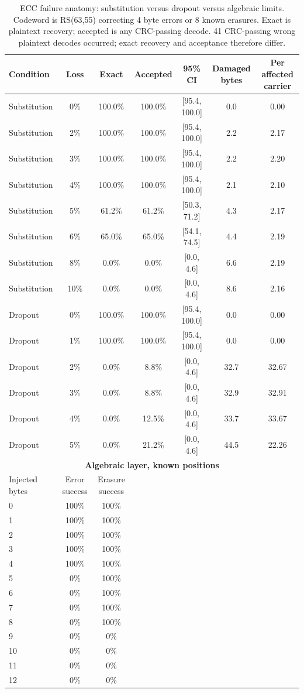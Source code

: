 \begin{table}[htbp]
\centering
\caption{ECC failure anatomy: substitution versus dropout versus algebraic limits. Codeword is RS(63,55) correcting 4 byte errors or 8 known erasures. Exact is plaintext recovery; accepted is any CRC-passing decode. 41 CRC-passing wrong plaintext decodes occurred; exact recovery and acceptance therefore differ.}
\label{tab:ecc_failure_modes}
\begin{tabular}{lcccccc}
\toprule
Condition & Loss & Exact & Accepted & 95\% CI & Damaged bytes & Per affected carrier \\
\midrule
Substitution & 0\% & 100.0\% & 100.0\% & [95.4, 100.0] & 0.0 & 0.00 \\
Substitution & 2\% & 100.0\% & 100.0\% & [95.4, 100.0] & 2.2 & 2.17 \\
Substitution & 3\% & 100.0\% & 100.0\% & [95.4, 100.0] & 2.2 & 2.20 \\
Substitution & 4\% & 100.0\% & 100.0\% & [95.4, 100.0] & 2.1 & 2.10 \\
Substitution & 5\% & 61.2\% & 61.2\% & [50.3, 71.2] & 4.3 & 2.17 \\
Substitution & 6\% & 65.0\% & 65.0\% & [54.1, 74.5] & 4.4 & 2.19 \\
Substitution & 8\% & 0.0\% & 0.0\% & [0.0, 4.6] & 6.6 & 2.19 \\
Substitution & 10\% & 0.0\% & 0.0\% & [0.0, 4.6] & 8.6 & 2.16 \\
Dropout & 0\% & 100.0\% & 100.0\% & [95.4, 100.0] & 0.0 & 0.00 \\
Dropout & 1\% & 100.0\% & 100.0\% & [95.4, 100.0] & 0.0 & 0.00 \\
Dropout & 2\% & 0.0\% & 8.8\% & [0.0, 4.6] & 32.7 & 32.67 \\
Dropout & 3\% & 0.0\% & 8.8\% & [0.0, 4.6] & 32.9 & 32.91 \\
Dropout & 4\% & 0.0\% & 12.5\% & [0.0, 4.6] & 33.7 & 33.67 \\
Dropout & 5\% & 0.0\% & 21.2\% & [0.0, 4.6] & 44.5 & 22.26 \\
\midrule
\multicolumn{7}{c}{\textbf{Algebraic layer, known positions}} \\
Injected bytes & Error success & Erasure success & & & & \\
0 & 100\% & 100\% & & & & \\
1 & 100\% & 100\% & & & & \\
2 & 100\% & 100\% & & & & \\
3 & 100\% & 100\% & & & & \\
4 & 100\% & 100\% & & & & \\
5 & 0\% & 100\% & & & & \\
6 & 0\% & 100\% & & & & \\
7 & 0\% & 100\% & & & & \\
8 & 0\% & 100\% & & & & \\
9 & 0\% & 0\% & & & & \\
10 & 0\% & 0\% & & & & \\
11 & 0\% & 0\% & & & & \\
12 & 0\% & 0\% & & & & \\
\bottomrule
\end{tabular}
\end{table}
